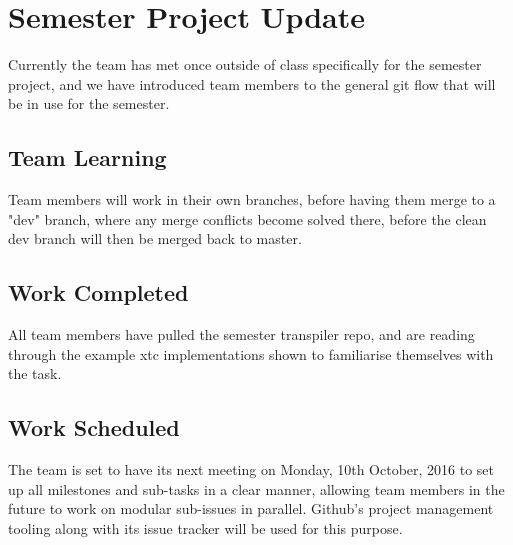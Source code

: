 \documentclass[letterpaper,11pt]{../texMemo} %
\begin{document}
\section{Semester Project Update}
Currently the team has met once outside of class specifically for the semester project, and we have introduced team members to the general git flow that will be in use for the semester.

\subsection{Team Learning}
Team members will work in their own branches, before having them merge to a "dev" branch, where any merge conflicts become solved there, before the clean dev branch will then be merged back to master.

\subsection{Work Completed}
All team members have pulled the semester transpiler repo, and are reading through the example xtc implementations shown to familiarise themselves with the task.

\subsection{Work Scheduled}
The team is set to have its next meeting on Monday, 10th October, 2016 to set up all milestones and sub-tasks in a clear manner, allowing team members in the future to work on modular sub-issues in parallel. Github's project management tooling along with its issue tracker will be used for this purpose.

\end{document}
